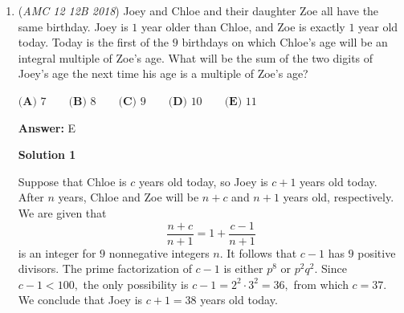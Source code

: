 \begin{enumerate}
 



\textbf{Solution 3 (Coordinate Geometry)}

This solution refers to the diagram in Solution 1.

 We place the diagram in the coordinate plane: Let $A=(0,30),B=(0,0),C=(30,0),D=(30,30),$ and $P=(3x,3y).$

 Recall that for any triangle in the coordinate plane, the coordinates of its centroid are the averages of the coordinates of its vertices. It follows that $G_1=(x,y+10),G_2=(x+10,y),G_3=(x+20,y+10),$ and $G_4=(x+10,y+20).$

 Note that $G_1G_3=G_2G_4=20$ and $\overline{G_1G_3}\perp\overline{G_2G_4}.$ Therefore, the area of quadrilateral $G_1G_2G_3G_4$ is 
 \[\frac12\cdot G_1G_3\cdot G_2G_4=\boxed{\textbf{(C) }200}.\]




\textbf{Solution 4 (Homothety) (Totally Stealing Solution 1's Idea)}

Let $X,Y,Z,W$ be the midpoints of sides $AB,BC,CD,DE$, respectively.

 Notice that a homothety centered at P with ratio $\frac{2}{3}$ will send $XYZW$ to $G_{1}G_{2}G_{3}G_{4}$, so $G_{1}G_{2}G_{3}G_{4}$ is a square with area $\left(\frac{2}{3}\right)^2 [XYZW]$, but $[XYZW]=\frac{1}{2}[ABCD]$ so our desired area is 
 \[\frac{4}{9}\cdot\frac{1}{2}\cdot900=\boxed{\textbf{(C) }200}\]

 Desmos graph:\href{https://www.desmos.com/calculator/cqozcf5ef1}{https://www.desmos.com/calculator/cqozcf5ef1}~Ynsg

 


	\item (\textit{AMC 12 12B 2018}) Joey and Chloe and their daughter Zoe all have the same birthday. Joey is $1$ year older than Chloe, and Zoe is exactly $1$ year old today. Today is the first of the $9$ birthdays on which Chloe's age will be an integral multiple of Zoe's age. What will be the sum of the two digits of Joey's age the next time his age is a multiple of Zoe's age?


 $\textbf{(A) }7 \qquad \textbf{(B) }8 \qquad \textbf{(C) }9 \qquad \textbf{(D) }10 \qquad \textbf{(E) }11 \qquad$

 \textbf{Answer: }E



\textbf{Solution 1}

Suppose that Chloe is $c$ years old today, so Joey is $c+1$ years old today. After $n$ years, Chloe and Zoe will be $n+c$ and $n+1$ years old, respectively. We are given that 
 \[\frac{n+c}{n+1}=1+\frac{c-1}{n+1}\] is an integer for $9$ nonnegative integers $n.$ It follows that $c-1$ has $9$ positive divisors. The prime factorization of $c-1$ is either $p^8$ or $p^2q^2.$ Since $c-1<100,$ the only possibility is $c-1=2^2\cdot3^2=36,$ from which $c=37.$ We conclude that Joey is $c+1=38$ years old today.


\end{enumerate}
